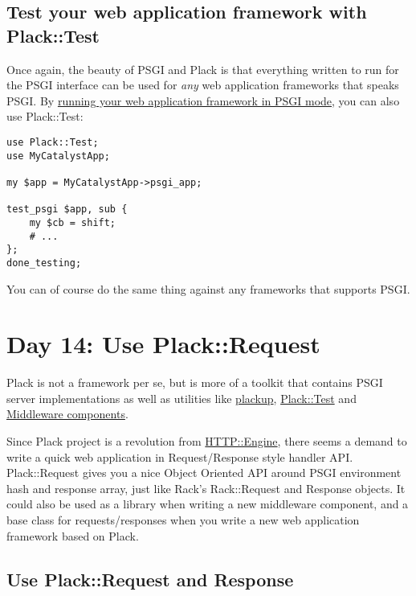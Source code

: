 \subsection{Test your web application framework with
Plack::Test}\label{test-your-web-application-framework-with-placktest}

Once again, the beauty of PSGI and Plack is that everything written to
run for the PSGI interface can be used for \emph{any} web application
frameworks that speaks PSGI. By
\href{http://advent.plackperl.org/2009/12/day-7-use-web-application-framework-in-psgi.html}{running
your web application framework in PSGI mode}, you can also use
Plack::Test:

\begin{lstlisting}
use Plack::Test;
use MyCatalystApp;

my $app = MyCatalystApp->psgi_app;

test_psgi $app, sub {
    my $cb = shift;
    # ...
};
done_testing;
\end{lstlisting}

You can of course do the same thing against any frameworks that supports
PSGI.

\section{Day 14: Use Plack::Request}\label{day-14-use-plackrequest}

Plack is not a framework per se, but is more of a toolkit that contains
PSGI server implementations as well as utilities like
\href{http://advent.plackperl.org/2009/12/day-3-using-plackup.html}{plackup},
\href{http://advent.plackperl.org/2009/12/day-13-use-placktest-to-test-your-application.html}{Plack::Test}
and
\href{http://advent.plackperl.org/2009/12/day-10-using-plack-middleware.html}{Middleware
components}.

Since Plack project is a revolution from
\href{http://search.cpan.org/perldoc?HTTP::Engine}{HTTP::Engine}, there
seems a demand to write a quick web application in Request/Response
style handler API. Plack::Request gives you a nice Object Oriented API
around PSGI environment hash and response array, just like Rack's
Rack::Request and Response objects. It could also be used as a library
when writing a new middleware component, and a base class for
requests/responses when you write a new web application framework based
on Plack.

\subsection{Use Plack::Request and
Response}\label{use-plackrequest-and-response}

